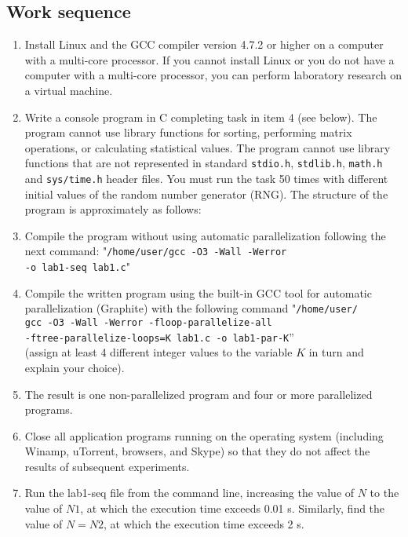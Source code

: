 { %
	\subsection{Work sequence}
	\begin{enumerate}
		\item Install Linux and the GCC compiler version 4.7.2 or higher on a computer with a multi-core processor. If you cannot install Linux or you do not have a computer with a multi-core processor, you can perform laboratory research on a virtual machine.
		\item Write a console program in C completing task in item 4 (see below). The program cannot use library functions for sorting, performing matrix operations, or calculating statistical values. The program cannot use library functions that are not represented in standard \texttt{stdio.h}, \texttt{stdlib.h}, \texttt{math.h} and \texttt{sys/time.h} header files. You must run the task 50 times with different initial values of the random number generator (RNG). The structure of the program is approximately as follows:
			\begin{figure}[H]
				
			\end{figure}
		\item Compile the program without using automatic parallelization following the next command: "\texttt{/home/user/gcc -O3 -Wall -Werror \\-o lab1-seq lab1.c}"
		\item Compile the written program using the built-in GCC tool for automatic parallelization (Graphite) with the following command  "\texttt{/home/user/\\gcc -O3 -Wall -Werror -floop-parallelize-all \\-ftree-parallelize-loops=K lab1.c -o lab1-par-K}” \\(assign at least 4 different integer values to the variable $ K $ in turn and explain your choice).
		\item The result is one non-parallelized program and four or more parallelized programs.
		\item Close all application programs running on the operating system (including Winamp, uTorrent, browsers, and Skype) so that they do not affect the results of subsequent experiments.
		\item Run the lab1-seq file from the command line, increasing the value of $ N $ to the value of $ N1 $, at which the execution time exceeds 0.01 s. Similarly, find the value of $ N=N2 $, at which the execution time exceeds 2 s.

\end{enumerate}}
